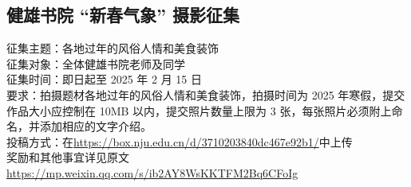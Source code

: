\documentclass[letterpaper, 12pt]{article}
\begin{document}
\begin{multicols}{2}
\section{健雄书院 “新春气象” 摄影征集}
征集主题：各地过年的风俗人情和美食装饰\\
征集对象：全体健雄书院老师及同学\\
征集时间：即日起至 2025 年 2 月 15 日\\
要求：拍摄题材各地过年的风俗人情和美食装饰，拍摄时间为 2025 年寒假，提交作品大小应控制在 10MB 以内，提交照片数量上限为 3 张，每张照片必须附上命名，并添加相应的文字介绍。\\
投稿方式：在\url{https://box.nju.edu.cn/d/3710203840dc467e92b1/}中上传\\
奖励和其他事宜详见原文\url{https://mp.weixin.qq.com/s/ib2AY8WsKKTFM2Bq6CFoIg}


\end{multicols} 
\end{document}
